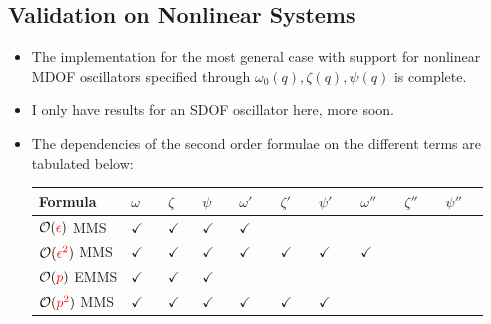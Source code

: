 \documentclass[11pt]{article}
\begin{document}
\subsection{Validation on Nonlinear Systems}
\label{sec:org8115394}
\begin{itemize}
\item The implementation for the most general case with support for nonlinear MDOF oscillators specified through \(\omega_0(q), \zeta(q), \psi(q)\) is complete.
\item I only have results for an SDOF oscillator here, more soon.
\item The dependencies of the second order formulae on the different terms are tabulated below:
\begin{center}
\begin{tabular}{llllllllll}
Formula & \(\omega\quad\) & \(\zeta\quad\) & \(\psi\quad\) & \(\omega'\quad\) & \(\zeta'\quad\) & \(\psi'\quad\) & \(\omega''\quad\) & \(\zeta''\quad\) & \(\psi''\quad\)\\[0pt]
\hline
\(\mathcal{O}(\textcolor{red}{\epsilon})\) MMS & \(\checkmark\) & \(\checkmark\) & \(\checkmark\) & \(\checkmark\) &  &  &  &  & \\[0pt]
\(\mathcal{O}(\textcolor{red}{\epsilon^2})\) MMS & \(\checkmark\) & \(\checkmark\) & \(\checkmark\) & \(\checkmark\) & \(\checkmark\) & \(\checkmark\) & \(\checkmark\) &  & \\[0pt]
\(\mathcal{O}(\textcolor{red}{p})\) EMMS & \(\checkmark\) & \(\checkmark\) & \(\checkmark\) &  &  &  &  &  & \\[0pt]
\(\mathcal{O}(\textcolor{red}{p^2})\) MMS & \(\checkmark\) & \(\checkmark\) & \(\checkmark\) & \(\checkmark\) & \(\checkmark\) & \(\checkmark\) &  &  & \\[0pt]
\end{tabular}
\end{center}
\end{itemize}
\end{document}
